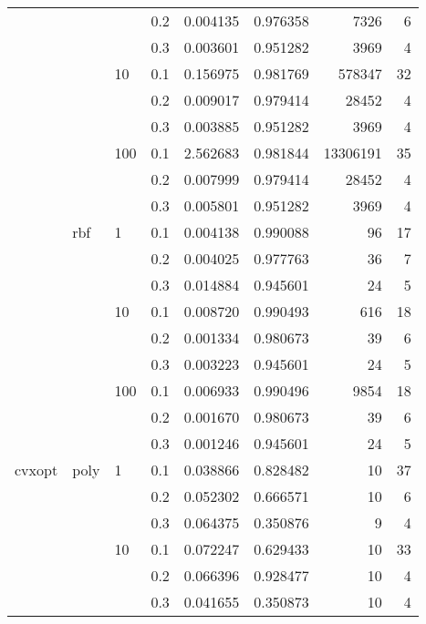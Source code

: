\begin{table}[H]
\begin{tabular}{llllrrrr}
       &     &     & 0.2 &     0.004135 &  0.976358 &      7326 &     6 \\
       &     &     & 0.3 &     0.003601 &  0.951282 &      3969 &     4 \\
       &     & 10  & 0.1 &     0.156975 &  0.981769 &    578347 &    32 \\
       &     &     & 0.2 &     0.009017 &  0.979414 &     28452 &     4 \\
       &     &     & 0.3 &     0.003885 &  0.951282 &      3969 &     4 \\
       &     & 100 & 0.1 &     2.562683 &  0.981844 &  13306191 &    35 \\
       &     &     & 0.2 &     0.007999 &  0.979414 &     28452 &     4 \\
       &     &     & 0.3 &     0.005801 &  0.951282 &      3969 &     4 \\
       & rbf & 1   & 0.1 &     0.004138 &  0.990088 &        96 &    17 \\
       &     &     & 0.2 &     0.004025 &  0.977763 &        36 &     7 \\
       &     &     & 0.3 &     0.014884 &  0.945601 &        24 &     5 \\
       &     & 10  & 0.1 &     0.008720 &  0.990493 &       616 &    18 \\
       &     &     & 0.2 &     0.001334 &  0.980673 &        39 &     6 \\
       &     &     & 0.3 &     0.003223 &  0.945601 &        24 &     5 \\
       &     & 100 & 0.1 &     0.006933 &  0.990496 &      9854 &    18 \\
       &     &     & 0.2 &     0.001670 &  0.980673 &        39 &     6 \\
       &     &     & 0.3 &     0.001246 &  0.945601 &        24 &     5 \\
cvxopt & poly & 1   & 0.1 &     0.038866 &  0.828482 &        10 &    37 \\
       &     &     & 0.2 &     0.052302 &  0.666571 &        10 &     6 \\
       &     &     & 0.3 &     0.064375 &  0.350876 &         9 &     4 \\
       &     & 10  & 0.1 &     0.072247 &  0.629433 &        10 &    33 \\
       &     &     & 0.2 &     0.066396 &  0.928477 &        10 &     4 \\
       &     &     & 0.3 &     0.041655 &  0.350873 &        10 &     4 \\

\end{tabular}
\end{table}
